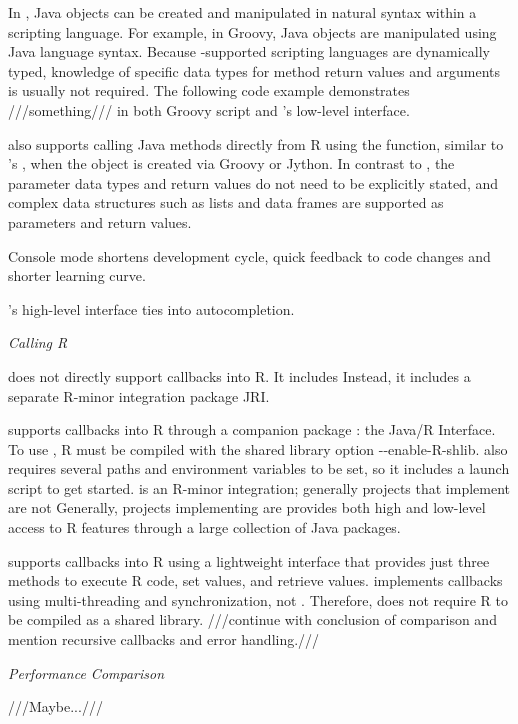 In , Java objects can be created and manipulated in natural syntax within a scripting language. For example, in Groovy, Java objects are manipulated using Java language syntax. Because -supported scripting languages are dynamically typed, knowledge of specific data types for method return values and arguments is usually not required. The following code example demonstrates ///something/// in both Groovy script and 's low-level interface.

 also supports calling Java methods directly from R using the  function, similar to 's , when the object is created via Groovy or Jython. In contrast to , the parameter data types and return values do not need to be explicitly stated, and complex data structures such as lists and data frames are supported as parameters and return values.

Console mode shortens development cycle, quick feedback to code changes and shorter learning curve.

's high-level interface ties into autocompletion. 

\noindent \textit{Calling R}

\noindent {} does not directly support callbacks into R. It includes  Instead, it includes a separate R-minor integration package JRI.

supports callbacks into R through a companion package : the Java/R Interface. To use , R must be compiled with the shared library option -{}-enable-R-shlib.  also requires several paths and environment variables to be set, so it includes a launch script to get started.  is an R-minor integration; generally projects that implement  are not  Generally, projects implementing  are   provides both high and low-level access to R features through a large collection of Java packages.

 supports callbacks into R using a lightweight interface that provides just three methods to execute R code, set values, and retrieve values.  implements callbacks using multi-threading and synchronization, not . Therefore,  does not require R to be compiled as a shared library. ///continue with conclusion of comparison and mention recursive callbacks and error handling.///

\noindent \textit{Performance Comparison}

\noindent ///Maybe...///

